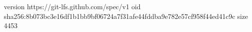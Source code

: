 version https://git-lfs.github.com/spec/v1
oid sha256:8b073bc3e16df1b1bb9bf06724a7f31afe44fddba9e782e57cf958f44ed41c9c
size 4453
